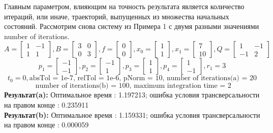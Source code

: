 \documentclass[10pt]{article}
\begin{document}
Главным параметром, влияющим на точность результата является количество итераций, или иначе, траекторий, выпущенных из множества начальных состояний. Рассмотрим снова систему из Примера 1 с двумя разными значениями number of iterations.
\[ A = \begin{bmatrix}
      		1 & -1 \\[0.3em]
      		1 & 1
      	  \end{bmatrix} , 
 B = \begin{bmatrix}
      	   3 & 0 \\[0.3em]
      	   0 & 3
      \end{bmatrix} ,
 f = \begin{bmatrix}
       	    0 \\[0.3em]
      	    0
      \end{bmatrix} ,
 x_0 = \begin{bmatrix}
      	    1 \\[0.3em]
      	    1
      \end{bmatrix} ,
 x_1 = \begin{bmatrix}
      	7 \\[0.3em]
      	10
      \end{bmatrix} ,
 Q = \begin{bmatrix}
      	   1 & -1 \\[0.3em]
      	   -1 & 2
      \end{bmatrix} \]
\[ p_1 = \begin{bmatrix}
      	-1 \\[0.3em]
      	-1
      \end{bmatrix} ,
p_2 = \begin{bmatrix}
      	-1 \\[0.3em]
      	1
      \end{bmatrix} ,
p_3 = \begin{bmatrix}
      	1 \\[0.3em]
      	1
      \end{bmatrix} ,
p_4 = \begin{bmatrix}
      	1 \\[0.3em]
      	-1
      \end{bmatrix}, r_1 = 3 \]
\[ t_0 = 0, \text{absTol = 1e-7, relTol = 1e-6, pNorm = 10, number of iterations(a) = 20} \]  
\[\text{ number of iterations(b) = 100, maximum integration time = 2} \]
\textbf{Результат(a):} Оптимальное время : 1.197213; ошибка условия трансверсальности на правом конце : 0.235911 \\
\textbf{Результат(b):} Оптимальное время : 1.159331; ошибка условия трансверсальности на правом конце : 0.000059
\end{document}
